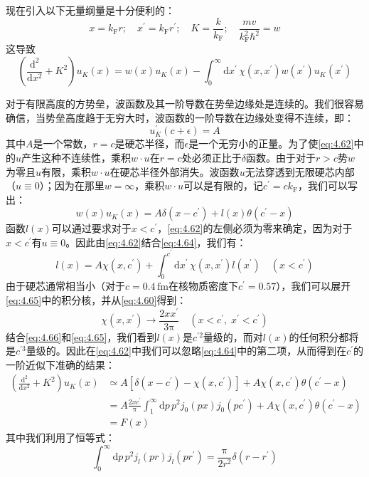 现在引入以下无量纲量是十分便利的：
\begin{equation}
x=k_{\text{F}}r;\quad x^{\prime}=k_{\text{F}}r^{\prime};\quad K=\frac{k}{k_{\text{F}}};\quad\frac{mv}{k^{2}_{\text{F}}\hbar^{2}}=w\label{eq:4.61}
\end{equation}
这导致
\begin{equation}
\left(\frac{\mathrm{d}^{2}}{\mathrm{d}x^{2}}+K^{2}\right)u_{K}(x)=w(x)u_{K}(x)-\int^{\infty}_{0}\mathrm{d}x^{\prime}\,\chi(x,x^{\prime})w(x^{\prime})u_{K}(x^{\prime})\label{eq:4.62}
\end{equation}

对于有限高度的方势垒，波函数及其一阶导数在势垒边缘处是连续的。我们很容易确信，当势垒高度趋于无穷大时，波函数的一阶导数在边缘处变得不连续，即：
\begin{equation}
u^{\prime}_{K}(c+\epsilon)=A\label{eq:4.63}
\end{equation}
其中$A$是一个常数，$r=c$是硬芯半径，而$\epsilon$是一个无穷小的正量。为了使\ref{eq:4.62}中的$u$产生这种不连续性，乘积$w\cdot u$在$r=c$处必须正比于$\delta$函数。由于对于$r>c$势$w$为零且$u$有限，乘积$w\cdot u$在硬芯半径外部消失。波函数$u$无法穿透到无限硬芯内部（$u\equiv0$）；因为在那里$w=\infty$，乘积$w\cdot u$可以是有限的，记$c^{\prime}=ck_{\text{F}}$，我们可以写出：
\begin{equation}
w(x)u_{K}(x)=A\delta(x-c^{\prime})+l(x)\theta(c^{\prime}-x)\label{eq:4.64}
\end{equation}
函数$l(x)$可以通过要求对于$x<c^{\prime}$，\ref{eq:4.62}的左侧必须为零来确定，因为对于$x<c^{\prime}$有$u\equiv0$。因此由\ref{eq:4.62}结合\ref{eq:4.64}，我们有：
\begin{equation}
l(x)=A\chi(x,c^{\prime})+\int^{c^{\prime}}_{0}\mathrm{d}x^{\prime}\,\chi(x,x^{\prime})l(x^{\prime})\quad(x<c^{\prime})\label{eq:4.65}
\end{equation}
由于硬芯通常相当小（对于$c=0.4\,\text{fm}$在核物质密度下$c^{\prime}=0.57$），我们可以展开\ref{eq:4.65}中的积分核，并从\ref{eq:4.60}得到：
\begin{equation}
\chi(x,x^{\prime})\rightarrow\frac{2xx^{\prime}}{3\mathrm{\pi}}\quad(x<c^{\prime},\;x^{\prime}<c^{\prime})\label{eq:4.66}
\end{equation}
结合\ref{eq:4.66}和\ref{eq:4.65}，我们看到$l(x)$是$c^{\prime2}$量级的，而对$l(x)$的任何积分都将是$c^{\prime3}$量级的。因此在\ref{eq:4.62}中我们可以忽略\ref{eq:4.64}中的第二项，从而得到在$c^{\prime}$的一阶近似下准确的结果：
\begin{align}
\left(\frac{\mathrm{d}^{2}}{\mathrm{d}x^{2}}+K^{2}\right)u_{K}(x) & \simeq A[\delta(x-c^{\prime})-\chi(x,c^{\prime})]+A\chi(x,c^{\prime})\theta(c^{\prime}-x)\nonumber \\
 & =A\frac{2xc^{\prime}}{\mathrm{\pi}}\int^{\infty}_{1}\mathrm{d}p\,p^{2}j_{0}(px)j_{0}(pc^{\prime})+A\chi(x,c^{\prime})\theta(c^{\prime}-x)\nonumber \\
 & =F(x)\label{eq:4.67}
\end{align}
其中我们利用了恒等式：
\begin{equation}
\int^{\infty}_{0}\mathrm{d}p\,p^{2}j_{l}(pr)j_{l}(pr^{\prime})=\frac{\mathrm{\pi}}{2r^{2}}\delta(r-r^{\prime})\label{eq:4.68}
\end{equation}

